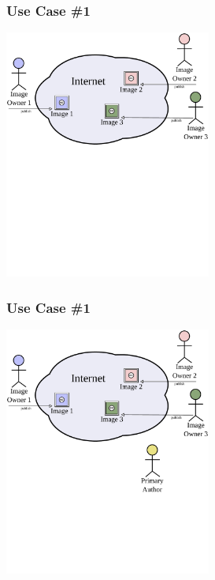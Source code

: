 \documentclass[mathserif,xcolor=dvipsnames,hyperref={bookmarks=true}]{beamer}
\begin{document}
    \begin{frame}[t]
        \frametitle{Use Case \#1}
        \begin{center}
            \includegraphics[width=0.51\textwidth]{../resources/usecases/usecase1/usecase1-step10.pdf}
        \end{center}
    \end{frame}
    \begin{frame}[t]
        \frametitle{Use Case \#1}
        \begin{center}
            \includegraphics[width=0.51\textwidth]{../resources/usecases/usecase1/usecase1-step11.pdf}
        \end{center}
    \end{frame}
\end{document}

